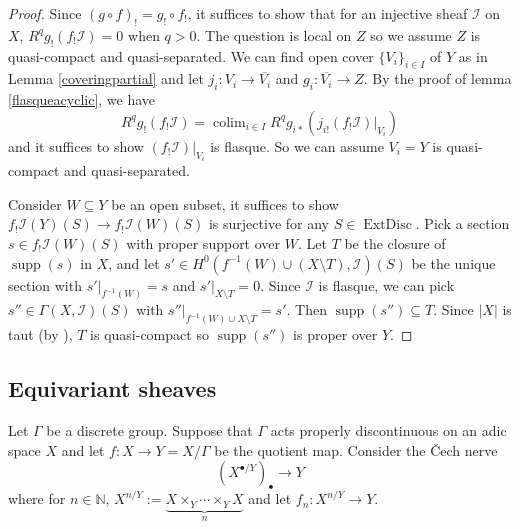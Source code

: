 \documentclass{article}
\theoremstyle{definition}
\def\sI{{\mathscr{I}}}
\def\bbN{\mathbb{N}}
\DeclareMathOperator{\colim}{colim}
\DeclareMathOperator{\supp}{supp}
\DeclareMathOperator{\ExtDisc}{ExtDisc}
\begin{document}
\begin{proof}
	Since $(g\circ f)_!=g_!\circ f_!$, it suffices to show that for an injective sheaf $\sI$ on $X$, $R^qg_!(f_!\sI)=0$ when $q>0$. The question is local on $Z$ so we assume $Z$ is quasi-compact and quasi-separated. We can find open cover $\{V_i\}_{i\in I}$ of $Y$ as in Lemma \ref{coveringpartial} and let $j_i: V_i\to \overline{V_i}$ and $g_i: \overline{V_i}\to Z$. By the proof of lemma \ref{flasqueacyclic}, we have
	$$R^qg_!(f_!\sI)=\colim_{i\in I} R^qg_{i*}(j_{i!}(f_!\sI)|_{V_i})$$
	and it suffices to show $(f_!\sI)|_{V_i}$ is flasque. So we can assume $V_i=Y$ is quasi-compact and quasi-separated. 
	
	Consider $W\subseteq Y$ be an open subset, it suffices to show $f_!\sI(Y)(S)\to f_!\sI(W)(S)$ is surjective for any $S\in \ExtDisc$. Pick a section $s \in f_!\sI(W)(S)$ with proper support over $W$. Let $T$ be the closure of $\supp(s)$ in $X$, and let $s' \in H^0(f^{-1}(W) \cup (X \setminus T),\sI)(S)$ be the unique section with $s'|_{f^{-1}(W)} = s$ and $s'|_{X\setminus T} = 0$. Since $\sI$ is flasque, we can pick $s'' \in \Gamma(X,\sI)(S)$ with $s''|_{f^{-1}(W)\cup X\setminus T} = s'$. Then $\supp(s'')\subseteq T$. Since $|X|$ is taut (by \cite[Proposition 18.10]{scholze2022etale}), $T$ is quasi-compact so $\supp(s'')$ is proper over $Y$. 
	\end{proof}
		
\subsection{Equivariant sheaves}\label{sec: appendixequivariantsheaves}
Let $\Gamma$ be a discrete group. Suppose that $\Gamma$ acts properly discontinuous on an adic space $X$ and let $f:X\rightarrow Y=X/\Gamma$ be the quotient map. Consider the Čech nerve
\[ (X^{\bullet/Y})_{\bullet}\rightarrow Y\]
where for $n\in\bbN$, $X^{n/Y}:=\underbrace{X\times_Y\cdots \times_YX}_{n}$ and let $f_n:X^{n/Y}\rightarrow  Y$.
\end{document}
